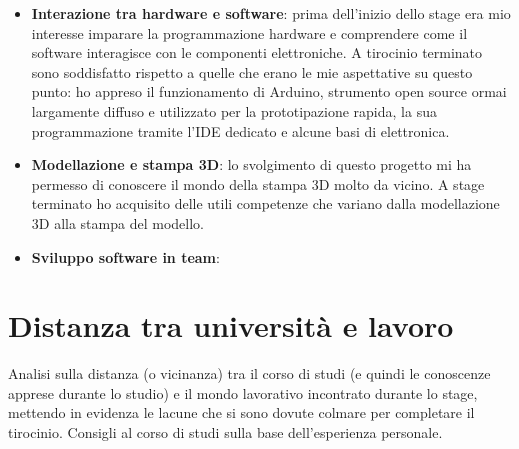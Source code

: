 \begin{itemize}
\item \textbf{Interazione tra hardware e software}: prima dell'inizio dello stage era mio interesse imparare la programmazione hardware e comprendere come il software interagisce con le componenti elettroniche. A tirocinio terminato sono soddisfatto rispetto a quelle che erano le mie aspettative su questo punto: ho appreso il funzionamento di Arduino, strumento open source ormai largamente diffuso e utilizzato per la prototipazione rapida, la sua programmazione tramite l'IDE dedicato e alcune basi di elettronica.
\item \textbf{Modellazione e stampa 3D}: lo svolgimento di questo progetto mi ha permesso di conoscere il mondo della stampa 3D molto da vicino. A stage terminato ho acquisito delle utili competenze che variano dalla modellazione 3D alla stampa del modello.
\item \textbf{Sviluppo software in team}:
\end{itemize}

\section{Distanza tra università e lavoro}
Analisi sulla distanza (o vicinanza) tra il corso di studi (e quindi le conoscenze apprese durante lo studio) e il mondo lavorativo incontrato durante lo stage, mettendo in evidenza le lacune che si sono dovute colmare per completare il tirocinio.
Consigli al corso di studi sulla base dell'esperienza personale.